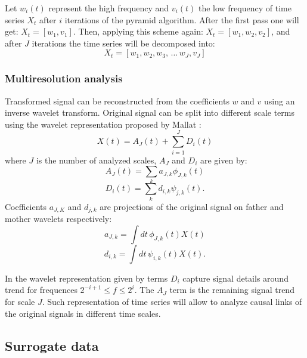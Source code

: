 Let $w_i(t)$ represent the high frequency and $v_i(t)$ the low frequency of time series $X_t$ after $i$ iterations of the pyramid algorithm.
After the first pass one will get: $X_t = [w_1, v_1]$.
Then, applying this scheme again: $X_t = [w_1, w_2, v_2]$, and after $J$ iterations the time series will be decomposed into:
\begin{equation}
	X_t = [w_1, w_2, w_3, \, \dots \, w_J, v_J]
\end{equation}



\subsubsection{Multiresolution analysis}
Transformed signal can be reconstructed from the coefficients $w$ and $v$ using an inverse wavelet transform.
Original signal can be split into different scale terms using the wavelet representation proposed by Mallat \cite{mallat1989}:
\begin{equation} \label{eq:decomposed}
	X(t) = A_J(t) + \sum_{i=1}^{J} D_i(t)
\end{equation}
where $J$ is the number of analyzed scales, $A_J$ and $D_i$ are given by:
\begin{equation}
	A_J(t) = \sum_k a_{J,k} \phi_{J,k}(t)
\end{equation}
\begin{equation}
	D_i(t) = \sum_k d_{i,k} \psi_{j,k}(t).
\end{equation}
Coefficients $a_{J,K}$ and $d_{j,k}$ are projections of the original signal on father and mother wavelets respectively:
\begin{equation}
	a_{J,k} = \int dt \, \phi_{J,k}(t) X(t)
\end{equation}
\begin{equation}
	d_{i,k} = \int dt \, \psi_{i,k}(t) X(t).
\end{equation}

In the wavelet representation given by  terms $D_i$ capture signal details around trend for frequences $2^{-i+1} \leq f \leq 2^{i}$.
The $A_J$ term is the remaining signal trend for scale $J$.
Such representation of time series will allow to analyze causal links of the original signals in different time scales.

\subsection{Surrogate data}

